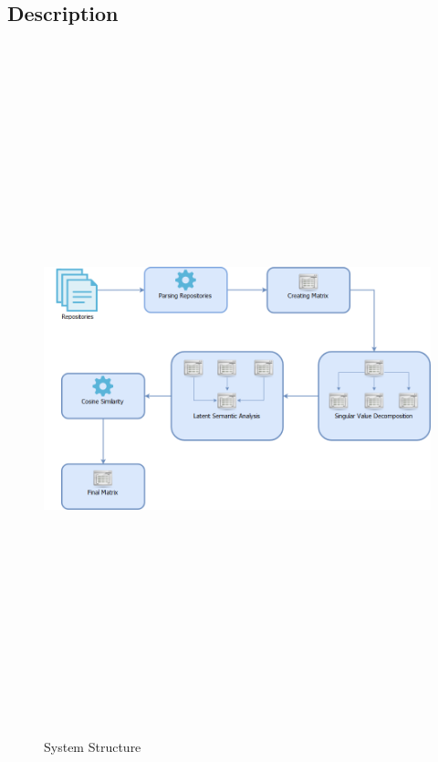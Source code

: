 
\subsection{Description}
\begin{figure}[!h]
\includegraphics[width=15cm,height=20cm,keepaspectratio]{images/Architecture.png}
\caption{System Structure}
\end{figure}

